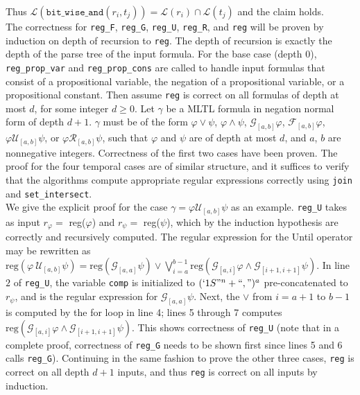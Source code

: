 \documentclass[runningheads]{llncs}
\renewcommand{\phi}{\varphi}
\begin{document}
Thus $\mathscr{L}(\texttt{bit\_wise\_and}(r_i, t_j)) = \mathscr{L}(r_i) \cap \mathscr{L}(t_j)$ and the claim holds.\\
The correctness for \texttt{reg\_F}, \texttt{reg\_G}, \texttt{reg\_U}, \texttt{reg\_R}, and \texttt{reg} will be proven by induction on depth of recursion to \texttt{reg}. 
The depth of recursion is exactly the depth of the parse tree of the input formula.
For the base case (depth $0$), \texttt{reg\_prop\_var} and \texttt{reg\_prop\_cons} are called to handle input formulas that consist of a propositional variable, the negation of a propositional variable, or a propositional constant.
Then assume \texttt{reg} is correct on all formulas of depth at most $d$, for some integer $d \geq 0$. 
Let $\gamma$ be a MLTL formula in negation normal form of depth $d + 1$. $\gamma$ must be of the form $\phi \lor \psi$, $\phi \land \psi$, $\mathcal{G}_{[a,b]}\phi$, $\mathcal{F}_{[a,b]}\phi$, $\phi \mathcal{U}_{[a,b]} \psi$, or $\phi \mathcal{R}_{[a,b]} \psi$, such that $\phi$ and $\psi$ are of depth at most $d$, and $a$, $b$ are nonnegative integers. 
Correctness of the first two cases have been proven. 
The proof for the four temporal cases are of similar structure, and it suffices to verify that the algorithms compute appropriate regular expressions correctly using \texttt{join} and \texttt{set\_intersect}.\\
We give the explicit proof for the case $\gamma = \phi \mathcal{U}_{[a,b]} \psi$ as an example.
\texttt{reg\_U} takes as input $r_\phi =$ reg($\phi$) and $r_\psi = $ reg($\psi$), which by the induction hypothesis are correctly and recursively computed. 
The regular expression for the Until operator may be rewritten as $\text{reg}(\phi \ \mathcal{U}_{[a,b]} \psi) = \text{reg}\left(\mathcal{G}_{[a, a]} \psi \right)\lor \bigvee_{i=a}^{b-1} \text{reg}\left(\mathcal{G}_{[a,i]}\phi \land \mathcal{G}_{[i+1, i+1]} \psi\right)$. 
In line $2$ of \texttt{reg\_U}, the variable \texttt{comp} is initialized to $(`1S"^n + ``,")^a$ pre-concatenated to $r_\psi$, and is the regular expression for $\mathcal{G}_[a, a] \psi$. 
Next, the $\lor$ from $i = a + 1$ to $b - 1$ is computed by the for loop in line 4; lines 5 through 7 computes $\text{reg}\left(\mathcal{G}_{[a,i]}\phi \land \mathcal{G}_{[i+1, i+1]} \psi\right)$. 
This shows correctness of \texttt{reg\_U} (note that in a complete proof, correctness of \texttt{reg\_G} needs to be shown first since lines 5 and 6 calls \texttt{reg\_G}).
Continuing in the same fashion to prove the other three cases, \texttt{reg} is correct on all depth $d+1$ inputs, and thus \texttt{reg} is correct on all inputs by induction.
\end{document}
